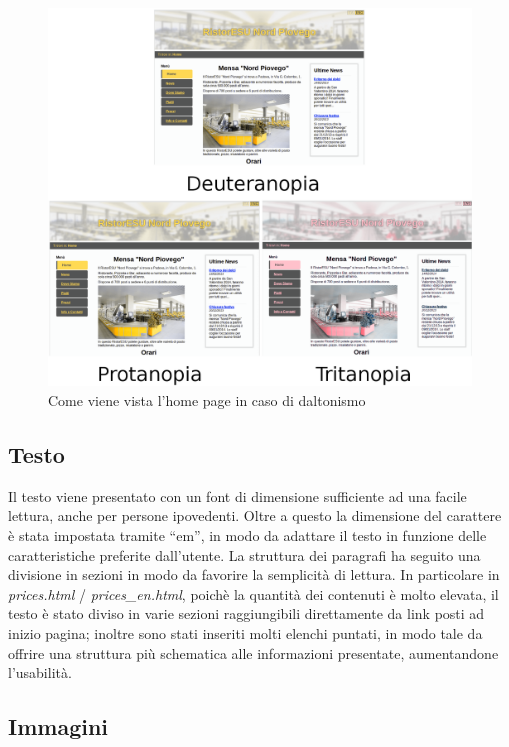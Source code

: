 \documentclass[10pt,a4paper,onecolumn]{article}
\begin{document}
\begin{figure}[h]
\centering
\includegraphics[scale=0.25]{home_colors}
\caption{Come viene vista l'home page in caso di daltonismo}
\label{colors}
\end{figure}

\subsection{Testo}

Il testo viene presentato con un font di dimensione sufficiente ad una facile lettura, anche per persone ipovedenti. Oltre a questo la dimensione del carattere è stata impostata tramite ``em'', in modo da adattare il testo in funzione delle caratteristiche preferite dall'utente.
La struttura dei paragrafi ha seguito una divisione in sezioni in modo da favorire la semplicità di lettura. In particolare in \textit{prices.html} / \textit{prices\_en.html}, poichè la quantità dei contenuti è molto elevata, il testo è stato diviso in varie sezioni raggiungibili direttamente da link posti ad inizio pagina; inoltre sono stati inseriti molti elenchi puntati, in modo tale da offrire una struttura più schematica alle informazioni presentate, aumentandone l'usabilità.

\subsection{Immagini}
\end{document}
